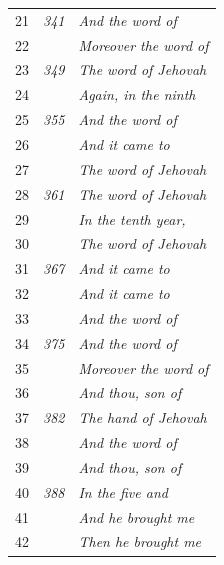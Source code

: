 \documentclass{article}
\newlength{\minipageheight}
\newlength{\minipagewidth}
\begin{document}
\begin{flushright}
\begin{minipage}[r][\minipageheight][t]{\minipagewidth}
\begin{longtable}{ccl}
            21          & \textit{341} & \textit{And the word of}            \\
            22          &              & \textit{Moreover the word of}       \\
            23          & \textit{349} & \textit{The word of Jehovah}        \\
            24          &              & \textit{Again, in the ninth}        \\
            25          & \textit{355} & \textit{And the word of}            \\
            26          &              & \textit{And it came to}             \\
            27          &              & \textit{The word of Jehovah}        \\
            28          & \textit{361} & \textit{The word of Jehovah}        \\
            29          &              & \textit{In the tenth year,}         \\
            30          &              & \textit{The word of Jehovah}        \\
            31          & \textit{367} & \textit{And it came to}             \\
            32          &              & \textit{And it came to}             \\
            33          &              & \textit{And the word of}            \\
            34          & \textit{375} & \textit{And the word of}            \\
            35          &              & \textit{Moreover the word of}       \\
            36          &              & \textit{And thou, son of}           \\
            37          & \textit{382} & \textit{The hand of Jehovah}        \\
            38          &              & \textit{And the word of}            \\
            39          &              & \textit{And thou, son of}           \\
            40          & \textit{388} & \textit{In the five and}            \\
            41          &              & \textit{And he brought me}          \\
            42          &              & \textit{Then he brought me}         \\

\end{longtable}
\end{minipage}
\end{flushright}
\end{document}
